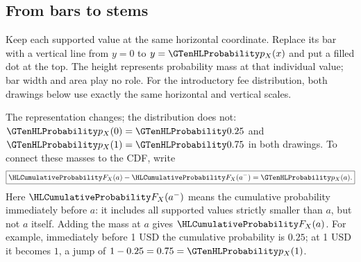 \subsection*{From bars to stems}
Keep each supported value at the same horizontal coordinate. Replace its
bar with a vertical line from $y=0$ to $y=\cTwoMassHL{p_X(x)}$ and put a filled dot at
the top. The height represents probability mass at that individual value;
bar width and area play no role. For the introductory fee distribution,
both drawings below use exactly the same horizontal and vertical scales.
\begin{center}
\begin{minipage}[t]{.49\linewidth}\centering
{}\end{minipage}\hfill
\begin{minipage}[t]{.49\linewidth}\centering
{}\end{minipage}
\end{center}
The representation changes; the distribution does not: $\cTwoMassHL{p_X(0)}=\cTwoMassHL{0.25}$
and $\cTwoMassHL{p_X(1)}=\cTwoMassHL{0.75}$ in both drawings. To connect these masses to the CDF,
write
\[
\boxed{\cTwoCDFHL{F_X(a)}-\cTwoCDFHL{F_X(a^-)}=\cTwoMassHL{p_X(a)}.}
\]
Here $\cTwoCDFHL{F_X(a^-)}$ means the cumulative probability immediately before $a$:
it includes all supported values strictly smaller than $a$, but not $a$
itself. Adding the mass at $a$ gives $\cTwoCDFHL{F_X(a)}$. For example, immediately
before 1 USD the cumulative probability is $0.25$; at 1 USD it becomes
$1$, a jump of $1-0.25=0.75=\cTwoMassHL{p_X(1)}$.
\clearpage
